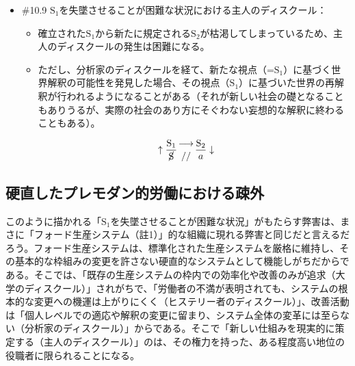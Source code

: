 \begin{note}{}
  \begin{itemize}
    \tightlist
    \item{\#10.9}
      $\textrm{S}_1$を失墜させることが困難な状況における\mbox{主人のディスクール}：
      \begin{itemize}
          \tightlist
          \item
          確立された$\textrm{S}_1$から新たに規定される$\textrm{S}_2$が枯渇してしまっているため、\mbox{主人のディスクール}の発生は困難になる。
          \item
          ただし、\mbox{分析家のディスクール}を経て、新たな視点（=$\textrm{S}_1$）に基づく世界解釈の可能性を発見した場合、その視点（$\textrm{S}_1$）に基づいた世界の再解釈が行われるようになることがある（それが新しい社会の礎となることもありうるが、実際の社会のあり方にそぐわない妄想的な解釈に終わることもある）。
        \end{itemize}

$$
\uparrow\frac{\mathrm{S_1}}{\cancel{\textrm{S}}}\genfrac{}{}{0pt}{}{\longrightarrow}{//}\frac{\mathrm{S_2}}{a}\downarrow
$$
  \end{itemize}
\end{note}

\subsection{硬直したプレモダン的労働における疎外}\label{ux786cux76f4ux3057ux305fux30d7ux30ecux30e2ux30c0ux30f3ux7684ux52b4ux50cdux306bux304aux3051ux308bux758eux5916}

このように描かれる「\(\textrm{S}_1\)を失墜させることが困難な状況」がもたらす弊害は、まさに「フォード生産システム（註1）」的な組織に現れる弊害と同じだと言えるだろう。フォード生産システムは、標準化された生産システムを厳格に維持し、その基本的な枠組みの変更を許さない硬直的なシステムとして機能しがちだからである。そこでは、「既存の生産システムの枠内での効率化や改善のみが追求（\mbox{大学のディスクール}）」されがちで、「労働者の不満が表明されても、システムの根本的な変更への機運は上がりにくく（\mbox{ヒステリー者のディスクール}）」、改善活動は「個人レベルでの適応や解釈の変更に留まり、システム全体の変革には至らない（\mbox{分析家のディスクール}）」からである。そこで「新しい仕組みを現実的に策定する（\mbox{主人のディスクール}）」のは、その権力を持った、ある程度高い地位の役職者に限られることになる。


